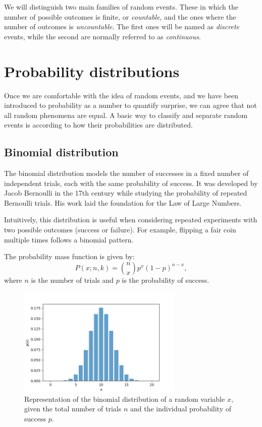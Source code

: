 \documentclass{book}
\begin{document}
We will distinguish two main families of random events. These in which the number of possible outcomes is finite, or \textit{countable}, and the ones where the number of outcomes is \textit{uncountable}. The first ones will be named as \textit{discrete} events, while the second are normally referred to as \textit{continuous}.

\newpage

\section{Probability distributions}
Once we are comfortable with the idea of random events, and we have been introduced to probability as a number to quantify surprise, we can agree that not all random phenomena are equal. A basic way to classify and separate random events is according to how their probabilities are distributed.

\subsection{Binomial distribution}
The binomial distribution models the number of successes in a fixed number of independent trials, each with the same probability of success. It was developed by Jacob Bernoulli in the 17th century while studying the probability of repeated Bernoulli trials. His work laid the foundation for the Law of Large Numbers.

Intuitively, this distribution is useful when considering repeated experiments with two possible outcomes (success or failure). For example, flipping a fair coin multiple times follows a binomial pattern.

The probability mass function is given by:
\begin{equation}
    P(x; n, k) = \binom{n}{x} p^x (1-p)^{n-x},
\end{equation}
where $n$ is the number of trials and $p$ is the probability of success.

\begin{figure}[ht]
    \centering
    \includegraphics[width=0.7\textwidth]{figures/chapter2/binomial.png}
    \caption{Representation of the binomial distribution of a random variable $x$, given the total number of trials $n$ and the individual probability of success $p$.}
    \label{fig:random}
\end{figure}
\end{document}
